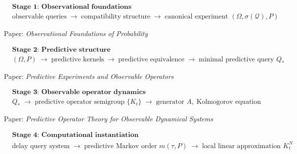 \documentclass[11pt]{article}
\begin{document}
\vspace{8pt}

\[
\begin{aligned}
&\textbf{Stage 1: Observational foundations} \\[6pt]
&\text{observable queries}
\;\longrightarrow\;
\text{compatibility structure}
\;\longrightarrow\;
\text{canonical experiment }(\Omega,\sigma(\mathcal{Q}),P)
\end{aligned}
\]

\begin{center}
Paper: \emph{Observational Foundations of Probability}
\end{center}

\vspace{8pt}

\[
\begin{aligned}
&\textbf{Stage 2: Predictive structure} \\[6pt]
&(\Omega,P)
\;\longrightarrow\;
\text{predictive kernels}
\;\longrightarrow\;
\text{predictive equivalence}
\;\longrightarrow\;
\text{minimal predictive query }Q_*
\end{aligned}
\]

\begin{center}
Paper: \emph{Predictive Experiments and Observable Operators}
\end{center}

\vspace{8pt}

\[
\begin{aligned}
&\textbf{Stage 3: Observable operator dynamics} \\[6pt]
&Q_*
\;\longrightarrow\;
\text{predictive operator semigroup }\{K_t\}
\;\longrightarrow\;
\text{generator }A,\;\text{Kolmogorov equation}
\end{aligned}
\]

\begin{center}
Paper: \emph{Predictive Operator Theory for Observable Dynamical Systems}
\end{center}

\vspace{8pt}

\[
\begin{aligned}
&\textbf{Stage 4: Computational instantiation} \\[6pt]
&\text{delay query system}
\;\longrightarrow\;
\text{predictive Markov order }m(\tau,P)
\;\longrightarrow\;
\text{local linear approximation }K_t^N
\end{aligned}
\]
\end{document}
